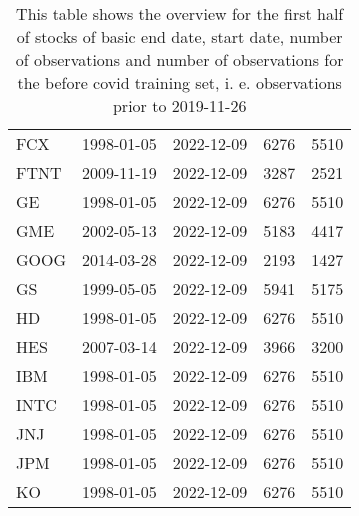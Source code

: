 \begin{table}[ht]
\begin{tabular}{lllrr}
  FCX & 1998-01-05 & 2022-12-09 & 6276 & 5510 \\ 
  FTNT & 2009-11-19 & 2022-12-09 & 3287 & 2521 \\ 
  GE & 1998-01-05 & 2022-12-09 & 6276 & 5510 \\ 
  GME & 2002-05-13 & 2022-12-09 & 5183 & 4417 \\ 
  GOOG & 2014-03-28 & 2022-12-09 & 2193 & 1427 \\ 
  GS & 1999-05-05 & 2022-12-09 & 5941 & 5175 \\ 
  HD & 1998-01-05 & 2022-12-09 & 6276 & 5510 \\ 
  HES & 2007-03-14 & 2022-12-09 & 3966 & 3200 \\ 
  IBM & 1998-01-05 & 2022-12-09 & 6276 & 5510 \\ 
  INTC & 1998-01-05 & 2022-12-09 & 6276 & 5510 \\ 
  JNJ & 1998-01-05 & 2022-12-09 & 6276 & 5510 \\ 
  JPM & 1998-01-05 & 2022-12-09 & 6276 & 5510 \\ 
  KO & 1998-01-05 & 2022-12-09 & 6276 & 5510 \\ 
   \hline
\end{tabular}
\caption[Overview_1]{This table shows the overview for the first half of stocks of basic end date, start date, number of observations and number of observations 
                     for the before covid training set, i. e. observations prior to 2019-11-26} 
\label{Table:Overview_1}
\end{table}
